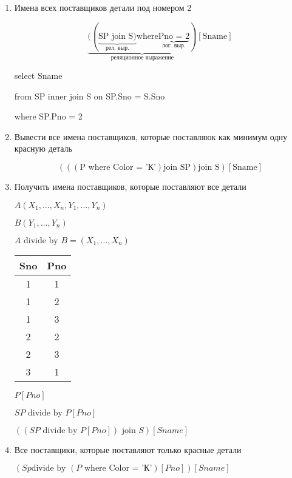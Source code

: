 \documentclass[a4paper, 14pt]{report}
\begin{document}
    \begin{enumerate}
        \item Имена всех поставщиков детали под номером 2

            $$
            \underbrace{((\underbrace{\text{SP join S})}_\text{рел. выр.} \text{where} \underbrace{\text{Pno = 2}}_{\text{лог. выр.}})}_\text{реляционное выражение}[\text{Sname}]
            $$

            select Sname

            from SP inner join S on SP.Sno = S.Sno

            where SP.Pno = 2

        \item Вывести все имена поставщиков, которые поставляюк как минимум одну красную деталь

            $$
            (((\text{P where } \text{Color = 'К'}) \text{join SP}) \text{join S})[\text{Sname}]
            $$

        \item Получить имена поставщиков, которые поставляют все детали

            $A(X_1, \dots, X_n, Y_1, \dots, Y_n)$

            $B(Y_1, \dots, Y_n)$

            $A \text{ divide by } B = (X_1, \dots, X_n)$

            \begin{tabular}{|c|c|}
                \hline
                Sno & Pno \\
                \hline
                1 & 1 \\
                1 & 2 \\
                1 & 3 \\
                2 & 2 \\
                2 & 3 \\
                3 & 1 \\
                \hline
            \end{tabular}

            $P[Pno]$

            $SP \text{ divide by } P[Pno]$

            $((SP \text{ divide by } P[Pno]) \text{ join } S)[Sname]$

        \item Все поставщики, которые поставляют только красные детали

            $(Sp \text{divide by }(P \text{ where } \text{Color = 'К'})[Pno])[Sname]$


\end{enumerate}
\end{document}
